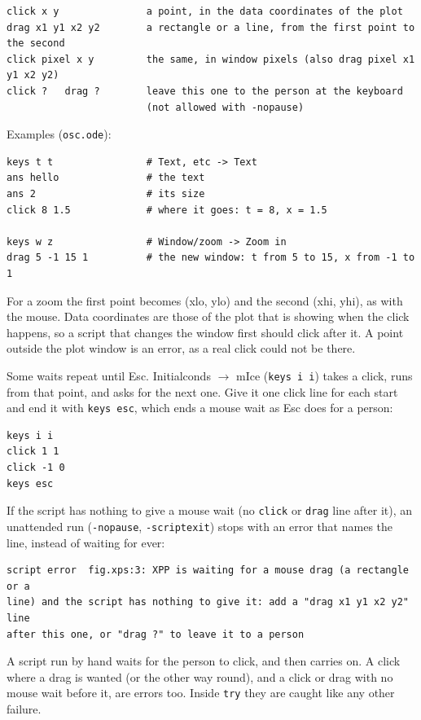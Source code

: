 \documentclass{article}
\begin{document}
{\small\begin{verbatim}
click x y               a point, in the data coordinates of the plot
drag x1 y1 x2 y2        a rectangle or a line, from the first point to the second
click pixel x y         the same, in window pixels (also drag pixel x1 y1 x2 y2)
click ?   drag ?        leave this one to the person at the keyboard
                        (not allowed with -nopause)
\end{verbatim}}

Examples (\texttt{osc.ode}):

{\small\begin{verbatim}
keys t t                # Text, etc -> Text
ans hello               # the text
ans 2                   # its size
click 8 1.5             # where it goes: t = 8, x = 1.5

keys w z                # Window/zoom -> Zoom in
drag 5 -1 15 1          # the new window: t from 5 to 15, x from -1 to 1
\end{verbatim}}

For a zoom the first point becomes (xlo, ylo) and the second (xhi,
yhi), as with the mouse. Data coordinates are those of the plot that is
showing when the click happens, so a script that changes the window
first should click after it. A point outside the plot window is an
error, as a real click could not be there.

Some waits repeat until Esc. Initialconds $\rightarrow$ mIce (\texttt{keys\ i\ i})
takes a click, runs from that point, and asks for the next one. Give it one
click line for each start and end it with \texttt{keys\ esc}, which ends a
mouse wait as Esc does for a person:

{\small\begin{verbatim}
keys i i
click 1 1
click -1 0
keys esc
\end{verbatim}}

If the script has nothing to give a mouse wait (no \texttt{click}
or \texttt{drag} line after it), an unattended run
(\texttt{-nopause}, \texttt{-scriptexit}) stops with an error
that names the line, instead of waiting for ever:

{\small\begin{verbatim}
script error  fig.xps:3: XPP is waiting for a mouse drag (a rectangle or a
line) and the script has nothing to give it: add a "drag x1 y1 x2 y2" line
after this one, or "drag ?" to leave it to a person
\end{verbatim}}

A script run by hand waits for the person to click, and then carries
on. A click where a drag is wanted (or the other way round), and a click
or drag with no mouse wait before it, are errors too. Inside
\texttt{try} they are caught like any other failure.
\end{document}
